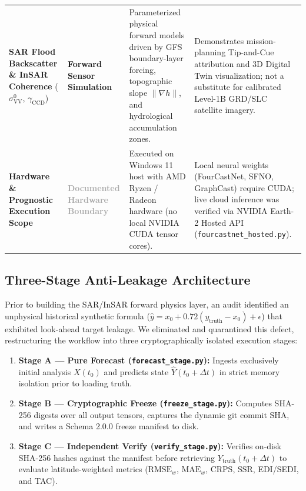 \documentclass[10pt,twocolumn,letterpaper]{article}
\begin{document}
\begin{table}[t]
\begin{tabularx}{\textwidth}{>{\raggedright\arraybackslash}p{3.6cm} >{\raggedright\arraybackslash}p{3.2cm} >{\raggedright\arraybackslash}p{4.7cm} >{\raggedright\arraybackslash}X}
\addlinespace[0.10cm]
\textbf{SAR Flood Backscatter \& InSAR Coherence} \newline ($\sigma^0_{\text{VV}}$, $\gamma_{\text{CCD}}$) & \textcolor{accentteal}{\textbf{Forward Sensor Simulation}} & Parameterized physical forward models driven by GFS boundary-layer forcing, topographic slope $\lVert\nabla h\rVert$, and hydrological accumulation zones. & Demonstrates mission-planning Tip-and-Cue attribution and 3D Digital Twin visualization; not a substitute for calibrated Level-1B GRD/SLC satellite imagery. \\
\addlinespace[0.10cm]
\textbf{Hardware \& Prognostic Execution Scope} & \textcolor{darkgray}{\textbf{Documented Hardware Boundary}} & Executed on Windows 11 host with AMD Ryzen / Radeon hardware (no local NVIDIA CUDA tensor cores). & Local neural weights (FourCastNet, SFNO, GraphCast) require CUDA; live cloud inference was verified via NVIDIA Earth-2 Hosted API (\texttt{fourcastnet\_hosted.py}). \\
\bottomrule
\end{tabularx}
\end{table}

\subsection{Three-Stage Anti-Leakage Architecture}
Prior to building the SAR/InSAR forward physics layer, an audit identified an unphysical historical synthetic formula ($\hat{y} = x_0 + 0.72(y_{\text{truth}} - x_0) + \epsilon$) that exhibited look-ahead target leakage. We eliminated and quarantined this defect, restructuring the workflow into three cryptographically isolated execution stages:
\begin{enumerate}[leftmargin=*,noitemsep,topsep=2pt]
    \item \textbf{Stage A --- Pure Forecast (\texttt{forecast\_stage.py}):} Ingests exclusively initial analysis $X(t_0)$ and predicts state $\hat{Y}(t_0 + \Delta t)$ in strict memory isolation prior to loading truth.
    \item \textbf{Stage B --- Cryptographic Freeze (\texttt{freeze\_stage.py}):} Computes SHA-256 digests over all output tensors, captures the dynamic git commit SHA, and writes a Schema 2.0.0 freeze manifest to disk.
    \item \textbf{Stage C --- Independent Verify (\texttt{verify\_stage.py}):} Verifies on-disk SHA-256 hashes against the manifest before retrieving $Y_{\text{truth}}(t_0 + \Delta t)$ to evaluate latitude-weighted metrics ($\text{RMSE}_w$, $\text{MAE}_w$, CRPS, SSR, EDI/SEDI, and TAC).
\end{enumerate}
\end{document}

